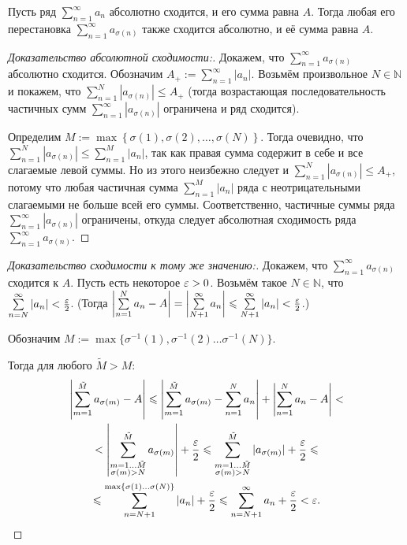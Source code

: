 \documentclass[a4paper, 12pt]{article}
\begin{document}
	\begin{Theorem}[Коши]
		Пусть ряд $\sum\limits_{n=1}^{\infty}a_n$ абсолютно сходится, и его сумма равна $A$. Тогда любая его перестановка $\sum\limits_{n=1}^{\infty}a_{\sigma(n)}$ также сходится абсолютно, и её сумма равна $A$.
	\end{Theorem}
	\begin{proof} [Доказательство абсолютной сходимости:]  
		Докажем, что $\sum\limits_{n=1}^{\infty}a_{\sigma(n)}$ абсолютно сходится.
		Обозначим $A_+ := \sum\limits_{n=1}^{\infty}|a_n|$.
		Возьмём произвольное $N\in \mathbb{N}$ и покажем, что  $\sum\limits_{n=1}^{N}|a_{\sigma(n)}| \leq A_+$ (тогда возрастающая последовательность частичных сумм $\sum\limits_{n=1}^{\infty}|a_{\sigma(n)}|$ ограничена и ряд сходится).

		Определим $M := \max \left\{\sigma(1), \sigma(2), \dots, \sigma(N)\right\}$.  Тогда очевидно, что $\sum\limits_{n=1}^{N}|a_{\sigma(n)}| \leq \sum\limits_{n=1}^{M}|a_{n}|$, так как правая сумма содержит в себе и все слагаемые левой суммы. Но из этого неизбежно следует и  $\sum\limits_{n=1}^{N}|a_{\sigma(n)}| \leq A_+$, потому что любая частичная сумма $\sum\limits_{n=1}^{M}|a_{n}|$ ряда с неотрицательными слагаемыми не больше всей его суммы. Соответственно, частичные суммы ряда $\sum\limits_{n=1}^{\infty}|a_{\sigma(n)}|$ ограничены, откуда следует абсолютная сходимость ряда $\sum\limits_{n=1}^{\infty}a_{\sigma(n)}$.
	\end{proof}
	\begin{proof} [Доказательство сходимости к тому же значению:]		
		Докажем, что $\sum\limits_{n=1}^{\infty}a_{\sigma(n)}$ сходится к $A$. Пусть есть некоторое $\varepsilon>0$. Возьмём такое $N\in \mathbb{N}$, что $\sum\limits_{n=N}^{\infty}|a_{n}| < \frac{\varepsilon}{2}$. (Тогда $\left| \sum\limits_{n=1}^{N}a_{n} - A\right| = \left| \sum\limits_{N+1}^{\infty}a_{n}\right| \leqslant \sum\limits_{N+1}^{\infty}|a_{n}| < \frac{\varepsilon}{2}$.) 
		
		Обозначим $M := \max\{ \sigma^{-1}(1), \sigma^{-1}(2)\dots \sigma^{-1}(N)\}$.
		 
		Тогда для любого $\tilde{M}>M$:
		\begin{multline}
		 \left| \sum\limits_{m=1}^{\tilde{M}}a_{\sigma(m)} - A \right|\leqslant \left| \sum\limits_{m=1}^{\tilde{M}}a_{\sigma(m)} - \sum\limits_{n=1}^{N}a_{n} \right| + \left| \sum\limits_{n=1}^{N}a_{n} - A \right| < \\ < \left| \sum\limits_{\substack{m=1\dots \tilde{M}\\ \sigma(m)>N} }^{\tilde{M}}a_{\sigma(m)}\right| + \frac{\varepsilon}{2} \leqslant   \sum\limits_{\substack {m=1\dots \tilde{M} \\ \sigma(m)>N} }^{\tilde{M}}|a_{\sigma(m)}| + \frac{\varepsilon}{2} \leqslant \\ \leqslant \sum\limits_{n=N+1}^{\max\{ \sigma(1)\dots \sigma(N)\}}|a_n| + \frac{\varepsilon}{2} \leqslant \sum\limits_{n=N+1}^{\infty}a_{n} +  \frac{\varepsilon}{2} < \varepsilon.
		 \end{multline}	
	\end{proof}
	
\end{document}
